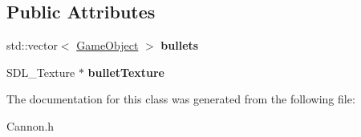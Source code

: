 \subsection*{Public Attributes}
\begin{DoxyCompactItemize}
\item 
\hypertarget{class_cannon_ae0d033a24c622ee1e9c7ab9888552040}{}std\+::vector$<$ \hyperlink{class_game_object}{Game\+Object} $>$ {\bfseries bullets}\label{class_cannon_ae0d033a24c622ee1e9c7ab9888552040}

\item 
\hypertarget{class_cannon_a39e3cd31451ff3d1a9a1b00fad4f5f30}{}S\+D\+L\+\_\+\+Texture $\ast$ {\bfseries bullet\+Texture}\label{class_cannon_a39e3cd31451ff3d1a9a1b00fad4f5f30}

\end{DoxyCompactItemize}


The documentation for this class was generated from the following file\+:\begin{DoxyCompactItemize}
\item 
Cannon.\+h\end{DoxyCompactItemize}
